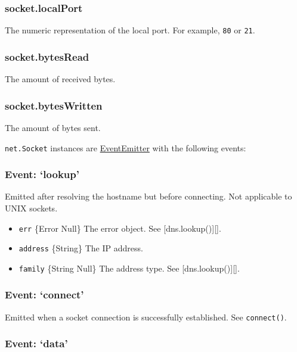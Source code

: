 \subsubsection{socket.localPort}\label{socket.localport}

The numeric representation of the local port. For example, \texttt{80}
or \texttt{21}.

\subsubsection{socket.bytesRead}\label{socket.bytesread}

The amount of received bytes.

\subsubsection{socket.bytesWritten}\label{socket.byteswritten}

The amount of bytes sent.

\texttt{net.Socket} instances are
\href{events.html\#events_class_events_eventemitter}{EventEmitter} with
the following events:

\subsubsection{Event: `lookup'}\label{event-lookup}

Emitted after resolving the hostname but before connecting. Not
applicable to UNIX sockets.

\begin{itemize}
\itemsep1pt\parskip0pt
\item
  \texttt{err} \{Error \textbar{} Null\} The error object. See
  {[}dns.lookup(){]}{[}{]}.
\item
  \texttt{address} \{String\} The IP address.
\item
  \texttt{family} \{String \textbar{} Null\} The address type. See
  {[}dns.lookup(){]}{[}{]}.
\end{itemize}

\subsubsection{Event: `connect'}\label{event-connect}

Emitted when a socket connection is successfully established. See
\texttt{connect()}.

\subsubsection{Event: `data'}\label{event-data}

